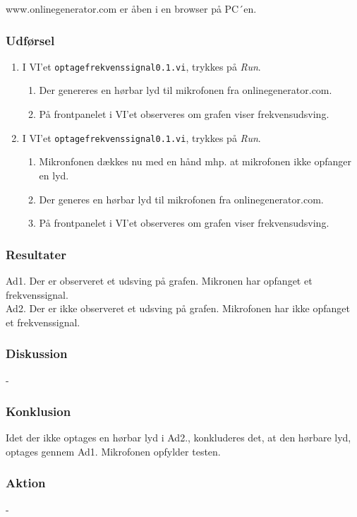 			www.onlinegenerator.com er åben i en browser på PC´en. 
	
		\subsubsection{Udførsel}
			\begin{enumerate}
				\item I VI'et \texttt{optagefrekvenssignal0.1.vi}, trykkes på \textit{Run}.  
				\begin{enumerate}
				\item Der genereres en hørbar lyd til mikrofonen fra onlinegenerator.com. 
				\item På frontpanelet i VI'et observeres om grafen viser frekvensudsving.
				\end{enumerate}
				\item I VI'et \texttt{optagefrekvenssignal0.1.vi}, trykkes på \textit{Run}. 
				\begin{enumerate}
				\item Mikronfonen dækkes nu med en hånd mhp. at mikrofonen ikke opfanger en lyd. 
				\item Der generes en hørbar lyd til mikrofonen fra onlinegenerator.com. 
				\item På frontpanelet i VI'et observeres om grafen viser frekvensudsving.
				\end{enumerate}
			\end{enumerate}
			
		\subsubsection{Resultater}
		Ad1. Der er observeret et udsving på grafen. Mikronen har opfanget et frekvenssignal. \\
		Ad2. Der er ikke observeret et udsving på grafen. Mikrofonen har ikke opfanget et frekvenssignal. 
		
		\subsubsection{Diskussion} 
		-
		\subsubsection{Konklusion}
		Idet der ikke optages en hørbar lyd i Ad2., konkluderes det, at den hørbare lyd, optages gennem Ad1. 
		Mikrofonen opfylder testen. 
		\subsubsection{Aktion}
		- 
	
